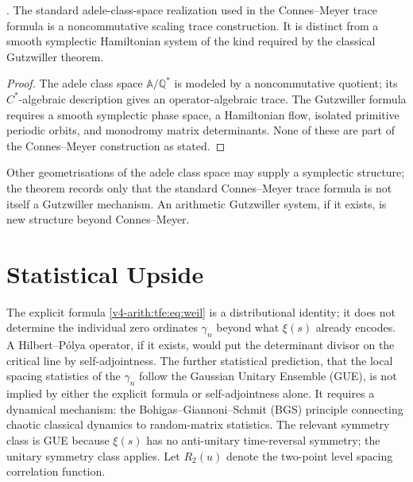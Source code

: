 \begin{theorem}
\label{v4-arith:tfe:thm:no-gutzwiller-connes}
\ClaimStatusProvedHere. The standard adele-class-space realization
used in the Connes--Meyer trace formula is a noncommutative scaling
trace construction. It is distinct from a smooth symplectic Hamiltonian
system of the kind required by the classical Gutzwiller theorem.
\end{theorem}

\begin{proof}
The adele class space \(\mathbb{A}/\mathbb{Q}^*\) is modeled by a
noncommutative quotient; its $C^*$-algebraic description gives an
operator-algebraic trace. The Gutzwiller formula requires a smooth
symplectic phase space, a Hamiltonian flow, isolated primitive periodic
orbits, and monodromy matrix determinants. None of these are part of
the Connes--Meyer construction as stated.
\end{proof}

\begin{remark}
\label{v4-arith:tfe:rem:partial-geom}
Other geometrisations of the adele class space may supply a symplectic
structure; the theorem records only that the standard Connes--Meyer
trace formula is not itself a Gutzwiller mechanism. An arithmetic
Gutzwiller system, if it exists, is new structure beyond Connes--Meyer.
\end{remark}

\section{Statistical Upside}
\label{v4-arith:tfe:bgs}

The explicit formula \eqref{v4-arith:tfe:eq:weil} is a distributional
identity; it does not determine the individual zero ordinates $\gamma_n$
beyond what $\xi(s)$ already encodes. A Hilbert--P\'{o}lya operator, if
it exists, would put the determinant divisor on the critical line by
self-adjointness. The further statistical prediction, that the local
spacing statistics of the $\gamma_n$ follow the Gaussian Unitary
Ensemble (GUE), is not implied by either the explicit formula or
self-adjointness alone. It requires a dynamical mechanism: the
Bohigas--Giannoni--Schmit (BGS) principle connecting chaotic classical
dynamics to random-matrix statistics. The relevant symmetry class is
GUE because $\xi(s)$ has no anti-unitary time-reversal symmetry;
the unitary symmetry class applies. Let $R_2(u)$ denote the two-point
level spacing correlation function.

